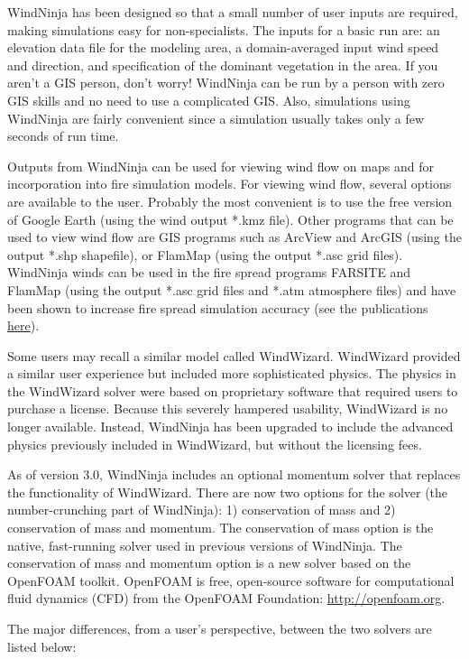\documentclass[12pt]{article}
\begin{document}
WindNinja has been designed so that a small number of user inputs are required, making simulations easy for non-specialists.  The inputs for a basic run are:  an elevation data file for the modeling area, a domain-averaged input wind speed and direction, and specification of the dominant vegetation in the area.  If you aren’t a GIS person, don’t worry!  WindNinja can be run by a person with zero GIS skills and no need to use a complicated GIS.  Also, simulations using WindNinja are fairly convenient since a simulation usually takes only a few seconds of run time.

Outputs from WindNinja can be used for viewing wind flow on maps and for incorporation into fire simulation models.  For viewing wind flow, several options are available to the user.  Probably the most convenient is to use the free version of Google Earth (using the wind output *.kmz file).  Other programs that can be used to view wind flow are GIS programs such as ArcView and ArcGIS (using the output *.shp shapefile), or FlamMap (using the output *.asc grid files).  WindNinja winds can be used in the fire spread programs FARSITE and FlamMap (using the output *.asc grid files and *.atm atmosphere files) and have been shown to increase fire spread simulation accuracy (see the publications \href{http://firelab.org/project/windninja}{here}).

Some users may recall a similar model called WindWizard. WindWizard provided a similar user experience but included more sophisticated physics. The physics in the WindWizard solver were based on proprietary software that required users to purchase a license. Because this severely hampered usability, WindWizard is no longer available. Instead, WindNinja has been upgraded to include the advanced physics previously included in WindWizard, but without the licensing fees.

As of version 3.0, WindNinja includes an optional momentum solver that replaces the functionality of WindWizard. There are now two options for the solver (the number-crunching part of WindNinja): 1) conservation of mass and 2) conservation of mass and momentum. The conservation of mass option is the native, fast-running solver used in previous versions of WindNinja. The conservation of mass and momentum option is a new solver based on the OpenFOAM toolkit. OpenFOAM is free, open-source software for computational fluid dynamics (CFD) from the OpenFOAM Foundation: \url{http://openfoam.org}. 

The major differences, from a user’s perspective, between the two solvers are listed below:
\end{document}
